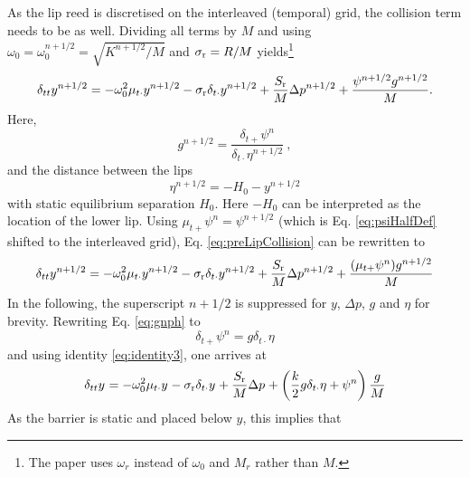 As the lip reed is discretised on the interleaved (temporal) grid, the collision term needs to be as well. Dividing all terms by $M$ and using $\omega_0 = \omega_0^{n+1/2} = \sqrt{K^{n+1/2}/M}$ and $\sigma_{\text{r}} = R/M$ yields\footnote{The paper uses $\omega_r$ instead of $\omega_0$ and $M_r$ rather than $M$.}
\begin{equation}\label{eq:preLipCollision}
    \delta_{tt}y^{n+1/2} = -\omega_0^2\mu_{t\cdot}y^{n+1/2}-\sigma_\text{r}\delta_{t\cdot}y^{n+1/2} + \frac{S_\text{r}}{M}\Delta p^{n+1/2} + \frac{\psi^{n+1/2}g^{n+1/2}}{M}.
\end{equation}
Here,
\begin{equation}\label{eq:gnph}
    g^{n+1/2} = \frac{\delta_{t+}\psi^n}{\delta_{t\cdot}\eta^{n+1/2}}\ ,
\end{equation}
and the distance between the lips
\begin{equation}\label{eq:etaBarrier}
    \eta^{n+1/2} = -H_0 - y^{n+1/2}
\end{equation}
with static equilibrium separation $H_0$. Here $-H_0$ can be interpreted as the location of the lower lip.
Using $\mu_{t+}\psi^n = \psi^{n+1/2}$ (which is Eq. \eqref{eq:psiHalfDef} shifted to the interleaved grid), Eq. \eqref{eq:preLipCollision} can be rewritten to
\begin{equation}
    \delta_{tt}y^{n+1/2} = -\omega_0^2\mu_{t\cdot}y^{n+1/2}-\sigma_\text{r}\delta_{t\cdot}y^{n+1/2} + \frac{S_\text{r}}{M}\Delta p^{n+1/2} + \frac{(\mu_{t+}\psi^n)g^{n+1/2}}{M}
\end{equation}
In the following, the superscript $n+1/2$ is suppressed for $y$, $\Delta p$, $g$ and $\eta$ for brevity. Rewriting Eq. \eqref{eq:gnph} to
\begin{equation}\label{eq:rewrittenPsi}
    \delta_{t+}\psi^n = g\delta_{t\cdot}\eta
\end{equation}
and using identity \eqref{eq:identity3}, one arrives at
\begin{equation}\label{eq:lipReedFDSCollision}
    \delta_{tt}y^{} = -\omega_0^2\mu_{t\cdot}y^{}-\sigma_\text{r}\delta_{t\cdot}y^{} + \frac{S_\text{r}}{M}\Delta p^{} + \left(\frac{k}{2}g\delta_{t\cdot}\eta + \psi^n\right)\frac{g}{M}
\end{equation}
As the barrier is static and placed below $y$, this implies that

